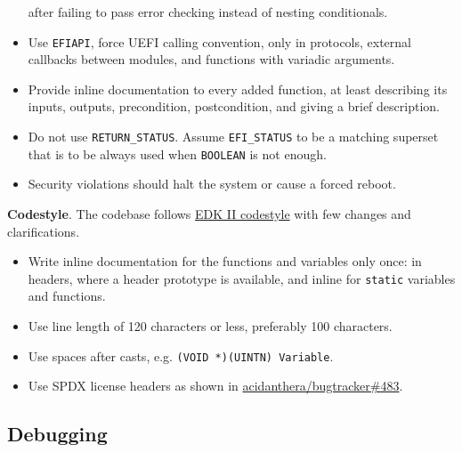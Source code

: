 \documentclass[]{article}
\makeatletter
\providecommand{\tightlist}{%
  \setlength{\itemsep}{0pt}\setlength{\parskip}{0pt}}
\renewcommand{\label}[1]{%
\zref@wrapper@immediate{\oldlabel{#1}}}  %
\makeatother
\begin{document}
\begin{itemize}
after failing to pass error checking instead of nesting conditionals.
\item Use \texttt{EFIAPI}, force UEFI calling convention, only in protocols, external callbacks between
modules, and functions with variadic arguments.
\item Provide inline documentation to every added function, at least describing its inputs, outputs,
precondition, postcondition, and giving a brief description.
\item Do not use \texttt{RETURN\_STATUS}. Assume \texttt{EFI\_STATUS} to be a matching superset that is
to be always used when \texttt{BOOLEAN} is not enough.
\item Security violations should halt the system or cause a forced reboot.
\end{itemize}

\textbf{Codestyle}. The codebase follows
\href{https://github.com/tianocore/tianocore.github.io/wiki/Code-Style-C}{EDK II codestyle} with few changes
and clarifications.
\begin{itemize}
\tightlist
\item Write inline documentation for the functions and variables only once: in headers, where a header prototype
is available, and inline for \texttt{static} variables and functions.
\item Use line length of 120 characters or less, preferably 100 characters.
\item Use spaces after casts, e.g. \texttt{(VOID *)(UINTN) Variable}.
\item Use SPDX license headers as shown in
\href{https://github.com/acidanthera/bugtracker/issues/483}{acidanthera/bugtracker\#483}.
\end{itemize}

\subsection{Debugging}\label{configuration-debug}
\end{document}
